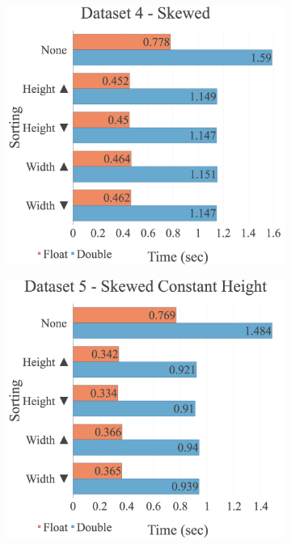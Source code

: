 \begin{figure}[H]
\begin{adjustwidth}{-2cm}{-2cm}
\begin{subfigure}{.62\textwidth}
  \centering
  \includegraphics[width=1\textwidth]{img/experiments/multi-sorts-4_SKEWED.png}
\end{subfigure}
\begin{subfigure}{.62\textwidth}
  \centering
  \includegraphics[width=1\textwidth]{img/experiments/multi-sorts-5_SKEWEDCONSTHEIGHT.png}

\end{subfigure}
\end{adjustwidth}
\end{figure}
